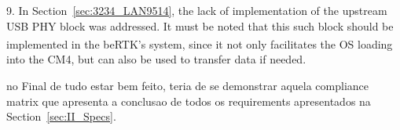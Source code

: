 9. %
In Section~\ref{sec:3234_LAN9514}, the lack of implementation of the upstream USB PHY block was addressed. It must be noted that this such block should be implemented in the beRTK\textsuperscript{\textregistered}'s system, since it not only facilitates the OS loading into the CM4, but can also be used to transfer data if needed.

no Final de tudo estar bem feito, teria de se demonstrar aquela compliance matrix que apresenta a conclusao de todos os requirements apresentados na Section~\ref{sec:II_Specs}.